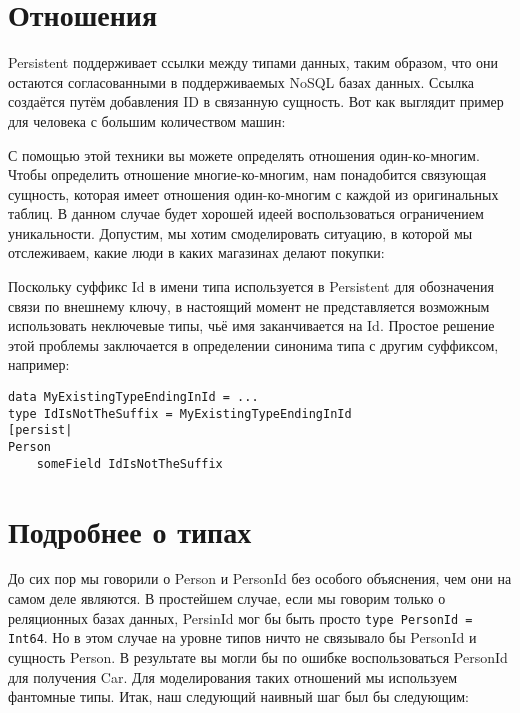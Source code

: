 \section{Отношения} %

Persistent поддерживает ссылки между типами данных, таким образом, что они остаются согласованными в поддерживаемых NoSQL базах данных. Ссылка создаётся путём добавления ID в связанную сущность. Вот как выглядит пример для человека с большим количеством машин:


С помощью этой техники вы можете определять отношения один-ко-многим. Чтобы определить отношение многие-ко-многим, нам понадобится связующая сущность, которая имеет отношения один-ко-многим с каждой из оригинальных таблиц. В данном случае будет хорошей идеей воспользоваться ограничением уникальности. Допустим, мы хотим смоделировать ситуацию, в которой мы отслеживаем, какие люди в каких магазинах делают покупки:


\begin{remark}
Поскольку суффикс Id в имени типа используется в Persistent для обозначения связи по внешнему ключу, в настоящий момент не представляется возможным использовать неключевые типы, чьё имя заканчивается на Id. Простое решение этой проблемы заключается в определении синонима типа с другим суффиксом, например:

\begin{lstlisting}
data MyExistingTypeEndingInId = ...
type IdIsNotTheSuffix = MyExistingTypeEndingInId
[persist|
Person
    someField IdIsNotTheSuffix
\end{lstlisting}%
\end{remark}

\section{Подробнее о типах} %

До сих пор мы говорили о Person и PersonId без особого объяснения, чем они на самом деле являются. В простейшем случае, если мы говорим только о реляционных базах данных, PersinId мог бы быть просто \lstinline'type PersonId = Int64'. Но в этом случае на уровне типов ничто не связывало бы PersonId и сущность Person. В результате вы могли бы по ошибке воспользоваться PersonId для получения Car. Для моделирования таких отношений мы используем фантомные типы. Итак, наш следующий наивный шаг был бы следующим:

